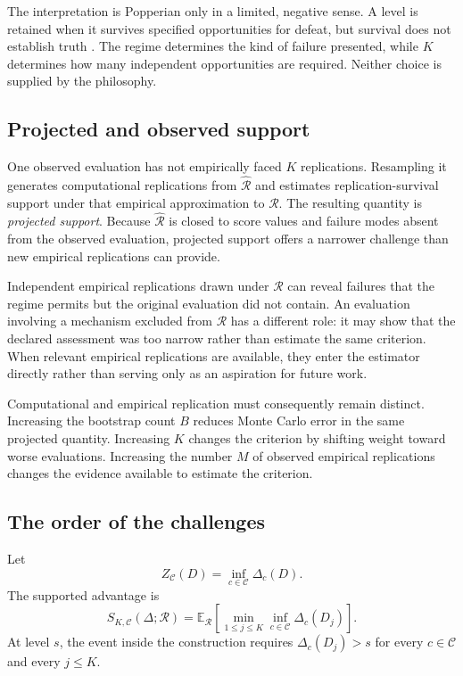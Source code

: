 \documentclass[11pt]{article}
\newcommand{\Regime}{\mathcal{R}}
\newcommand{\CSet}{\mathcal{C}}
\newcommand{\E}{\mathbb{E}}
\theoremstyle{remark}
\begin{document}
The interpretation is Popperian only in a limited, negative sense. A level is retained when it survives specified opportunities for defeat, but survival does not establish truth \cite{popper1959logic,popper1963conjectures}. The regime determines the kind of failure presented, while $K$ determines how many independent opportunities are required. Neither choice is supplied by the philosophy.

\subsection{Projected and observed support}
\label{sec:projected}

One observed evaluation has not empirically faced $K$ replications. Resampling it generates computational replications from $\widehat{\Regime}$ and estimates replication-survival support under that empirical approximation to $\Regime$. The resulting quantity is \emph{projected support}. Because $\widehat{\Regime}$ is closed to score values and failure modes absent from the observed evaluation, projected support offers a narrower challenge than new empirical replications can provide.

Independent empirical replications drawn under $\Regime$ can reveal failures that the regime permits but the original evaluation did not contain. An evaluation involving a mechanism excluded from $\Regime$ has a different role: it may show that the declared assessment was too narrow rather than estimate the same criterion. When relevant empirical replications are available, they enter the estimator directly rather than serving only as an aspiration for future work.

Computational and empirical replication must consequently remain distinct. Increasing the bootstrap count $B$ reduces Monte Carlo error in the same projected quantity. Increasing $K$ changes the criterion by shifting weight toward worse evaluations. Increasing the number $M$ of observed empirical replications changes the evidence available to estimate the criterion.

\subsection{The order of the challenges}

Let
\[
Z_{\CSet}(D)
=
\inf_{c\in\CSet}\Delta_c(D).
\]
The supported advantage is
\begin{equation}
S_{K,\CSet}(\Delta;\Regime)
=
\E_{\Regime}
\left[
\min_{1\leq j\leq K}
\inf_{c\in\CSet}\Delta_c(D_j)
\right].
\label{eq:robust-support}
\end{equation}
At level $s$, the event inside the construction requires $\Delta_c(D_j)>s$ for every $c\in\CSet$ and every $j\leq K$.
\end{document}
